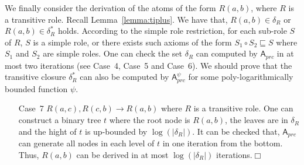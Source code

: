 We finally consider the derivation of the atoms of the form $R(a,b)$, where $R$
is a transitive role.
Recall Lemma~\ref{lemma:tiplus}. We have that, $R(a,b)\in\delta_R$ or
$R(a,b)\in\delta^*_R$ holds.
According to the simple role restriction, for each sub-role $S$ of $R$, $S$ is a simple role,
or there exists such axioms
of the form $S_1\circ S_2\sqsubseteq S$ where $S_1$ and $S_2$ are simple roles.
One can check the set $\delta_R$ can computed by $\mathsf{A}_{prc}$ in
at most two iterations (see Case~4, Case~5 and Case~6).
We should prove that the transitive closure $\delta^*_R$
can also be computed by $\mathsf{A}_{prc}^\psi$ for some
poly-logarithmically bounded function $\psi$.

\begin{enumerate}[leftmargin=12ex]
\item[Case~7] $R(a,c),R(c,b)\rightarrow R(a,b)$ where $R$ is a transitive role.
    One can construct a binary tree $t$ where the root node is $R(a,b)$,
    the leaves are in $\delta_R$ and the hight of $t$ is up-bounded by
    $\log(|\delta_R|)$. It can be checked that, $\mathsf{A}_{prc}$ can generate
    all nodes in each level of $t$ in one iteration from the bottom. Thus,
    $R(a,b)$ can be derived in at most $\log(|\delta_R|)$ iterations.\hfill$\Box$
\end{enumerate}




